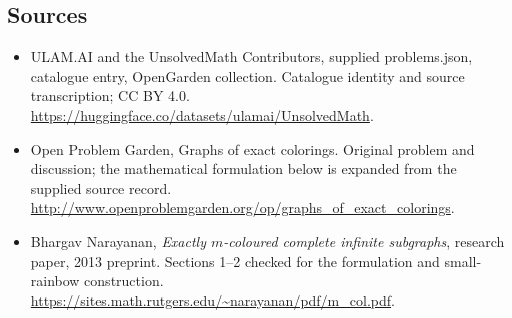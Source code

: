 \documentclass[11pt,a4paper]{article}
\begin{document}
\subsection{Sources}
\begin{itemize}
\item[S1] ULAM.AI and the UnsolvedMath Contributors, supplied problems.json, catalogue entry, OpenGarden collection. Catalogue identity and source transcription; CC BY 4.0.
\url{https://huggingface.co/datasets/ulamai/UnsolvedMath}.
\item[S2] Open Problem Garden, Graphs of exact colorings. Original problem and discussion; the mathematical formulation below is expanded from the supplied source record.
\url{http://www.openproblemgarden.org/op/graphs_of_exact_colorings}.

\item[R1] Bhargav Narayanan, \emph{Exactly $m$-coloured complete infinite
subgraphs}, research paper, 2013 preprint. Sections 1--2 checked for the
formulation and small-rainbow construction.
\url{https://sites.math.rutgers.edu/~narayanan/pdf/m_col.pdf}.

\end{itemize}
\end{document}
